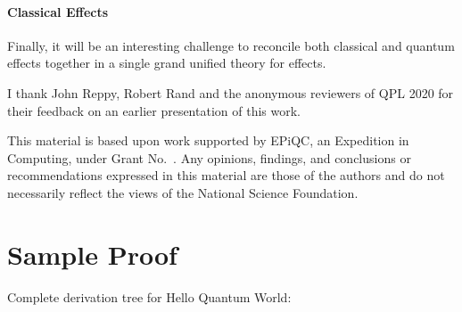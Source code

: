 \documentclass[acmsmall,nonacm,timestamp,review=false,anonymous=false]{acmart}
\newcommand{\qwire}{\ensuremath{\mathcal{Q}\textsc{wire}}\xspace}
\begin{document}
\paragraph{Classical Effects} Finally, it will be an interesting challenge to reconcile both classical and quantum effects together in a single grand unified theory for effects.


\begin{acks}
	I thank John Reppy, Robert Rand and the anonymous reviewers of QPL 2020 for their feedback on an earlier presentation of this work.

	This material is based upon work supported by
	EPiQC, an 
	Expedition in Computing, under Grant
	No.~.  Any opinions, findings, and
	conclusions or recommendations expressed in this material are those
	of the authors and do not necessarily reflect the views of the
	National Science Foundation.
\end{acks}

\newpage



\newpage

\newpage

\appendix

\section{Sample Proof}
Complete derivation tree for Hello Quantum World:
\end{document}
